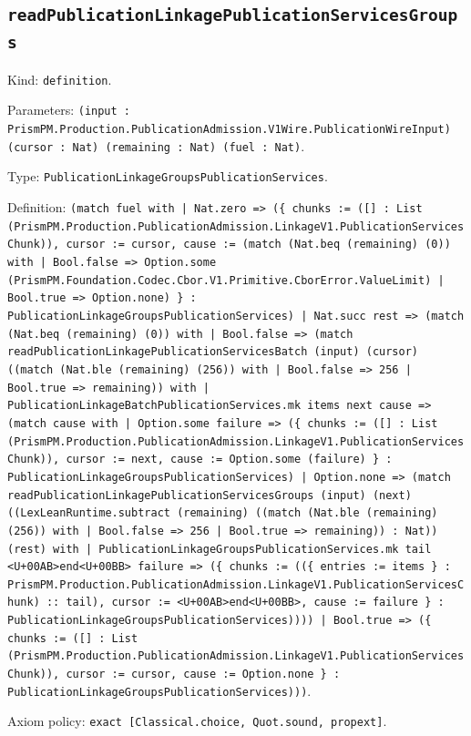 \documentclass[11pt]{article}
\begin{document}
\subsection*{\texttt{readPublicationLinkagePublicationServicesGroups}}
\noindent Kind: \texttt{definition}.\par
\noindent Parameters: \texttt{(input : PrismPM.Production.PublicationAdmission.V1Wire.PublicationWireInput) (cursor : Nat) (remaining : Nat) (fuel : Nat)}.\par
\noindent Type: \texttt{PublicationLinkageGroupsPublicationServices}.\par
\noindent Definition: \texttt{(match fuel with | Nat.zero => (\{ chunks := ([] : List (PrismPM.Production.PublicationAdmission.LinkageV1.PublicationServicesChunk)), cursor := cursor, cause := (match (Nat.beq (remaining) (0)) with | Bool.false => Option.some (PrismPM.Foundation.Codec.Cbor.V1.Primitive.CborError.ValueLimit) | Bool.true => Option.none) \} : PublicationLinkageGroupsPublicationServices) | Nat.succ rest => (match (Nat.beq (remaining) (0)) with | Bool.false => (match readPublicationLinkagePublicationServicesBatch (input) (cursor) ((match (Nat.ble (remaining) (256)) with | Bool.false => 256 | Bool.true => remaining)) with | PublicationLinkageBatchPublicationServices.mk items next cause => (match cause with | Option.some failure => (\{ chunks := ([] : List (PrismPM.Production.PublicationAdmission.LinkageV1.PublicationServicesChunk)), cursor := next, cause := Option.some (failure) \} : PublicationLinkageGroupsPublicationServices) | Option.none => (match readPublicationLinkagePublicationServicesGroups (input) (next) ((LexLeanRuntime.subtract (remaining) ((match (Nat.ble (remaining) (256)) with | Bool.false => 256 | Bool.true => remaining)) : Nat)) (rest) with | PublicationLinkageGroupsPublicationServices.mk tail <U+00AB>end<U+00BB> failure => (\{ chunks := ((\{ entries := items \} : PrismPM.Production.PublicationAdmission.LinkageV1.PublicationServicesChunk) :: tail), cursor := <U+00AB>end<U+00BB>, cause := failure \} : PublicationLinkageGroupsPublicationServices)))) | Bool.true => (\{ chunks := ([] : List (PrismPM.Production.PublicationAdmission.LinkageV1.PublicationServicesChunk)), cursor := cursor, cause := Option.none \} : PublicationLinkageGroupsPublicationServices)))}.\par
\noindent Axiom policy: \texttt{exact [Classical.choice, Quot.sound, propext]}.\par
\end{document}
